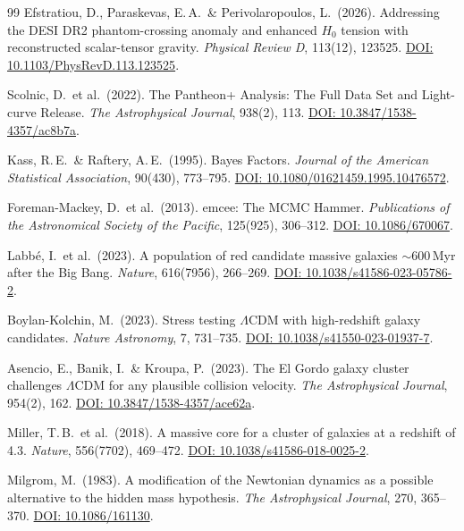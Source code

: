 \documentclass[aps,prd,twocolumn,superscriptaddress,nofootinbib]{revtex4-2}
\begin{document}
\begin{thebibliography}{99}
Efstratiou, D., Paraskevas, E.\,A.\ \& Perivolaropoulos, L.\ (2026).
Addressing the DESI DR2 phantom-crossing anomaly and enhanced $H_0$ tension with reconstructed scalar-tensor gravity.
\textit{Physical Review D}, 113(12), 123525.
\href{https://doi.org/10.1103/PhysRevD.113.123525}{DOI: 10.1103/PhysRevD.113.123525}.

Scolnic, D.\ et al.\ (2022).
The Pantheon+ Analysis: The Full Data Set and Light-curve Release.
\textit{The Astrophysical Journal}, 938(2), 113.
\href{https://doi.org/10.3847/1538-4357/ac8b7a}{DOI: 10.3847/1538-4357/ac8b7a}.

Kass, R.\,E.\ \& Raftery, A.\,E.\ (1995).
Bayes Factors.
\textit{Journal of the American Statistical Association}, 90(430), 773--795.
\href{https://doi.org/10.1080/01621459.1995.10476572}{DOI: 10.1080/01621459.1995.10476572}.

Foreman-Mackey, D.\ et al.\ (2013).
emcee: The MCMC Hammer.
\textit{Publications of the Astronomical Society of the Pacific}, 125(925), 306--312.
\href{https://doi.org/10.1086/670067}{DOI: 10.1086/670067}.

Labb\'e, I.\ et al.\ (2023).
A population of red candidate massive galaxies $\sim$600\,Myr after the Big Bang.
\textit{Nature}, 616(7956), 266--269.
\href{https://doi.org/10.1038/s41586-023-05786-2}{DOI: 10.1038/s41586-023-05786-2}.

Boylan-Kolchin, M.\ (2023).
Stress testing $\Lambda$CDM with high-redshift galaxy candidates.
\textit{Nature Astronomy}, 7, 731--735.
\href{https://doi.org/10.1038/s41550-023-01937-7}{DOI: 10.1038/s41550-023-01937-7}.

Asencio, E., Banik, I.\ \& Kroupa, P.\ (2023).
The El Gordo galaxy cluster challenges $\Lambda$CDM for any plausible collision velocity.
\textit{The Astrophysical Journal}, 954(2), 162.
\href{https://doi.org/10.3847/1538-4357/ace62a}{DOI: 10.3847/1538-4357/ace62a}.

Miller, T.\,B.\ et al.\ (2018).
A massive core for a cluster of galaxies at a redshift of 4.3.
\textit{Nature}, 556(7702), 469--472.
\href{https://doi.org/10.1038/s41586-018-0025-2}{DOI: 10.1038/s41586-018-0025-2}.

Milgrom, M.\ (1983).
A modification of the Newtonian dynamics as a possible alternative to the hidden mass hypothesis.
\textit{The Astrophysical Journal}, 270, 365--370.
\href{https://doi.org/10.1086/161130}{DOI: 10.1086/161130}.


\end{thebibliography}
\end{document}
